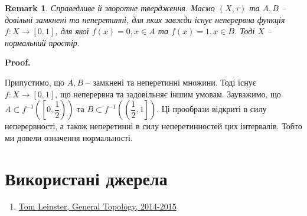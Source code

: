 \documentclass[a4paper, 10pt]{article}
\makeatletter
\theoremstyle{theoremdd}
\newtheorem{definition}[theorem]{Definition}
\newtheorem{remark}[theorem]{Remark}
\renewenvironment{proof}[1][Proof.\\]{\par
\pushQED{\hfill \qed}%
\normalfont \topsep6\p@\@plus6\p@\relax
\trivlist
\item\relax
{\bfseries
#1\@addpunct{.}}\hspace\labelsep\ignorespaces
}{%
\popQED\endtrivlist\@endpefalse
}
\makeatother
\begin{document}
\begin{remark}
Справедливе й зворотне твердження. Маємо $(X,\tau)$ та $A,B$ -- довільні замкнені та неперетинні, для яких завжди існує неперервна функція $f \colon X \to [0,1]$, для якої $f(x) = 0, x \in A$ та $f(x) = 1, x \in B$. Тоді $X$ -- нормальний простір.
\end{remark}

\begin{proof}
Припустимо, що $A,B$ -- замкнені та неперетинні множини. Тоді існує $f \colon X \to [0,1]$, що неперервна та задовільняє іншим умовам. Зауважимо, що $A \subset f^{-1} \left(\left[0, \dfrac{1}{2}\right)\right)$ та $B \subset f^{-1}\left(\left(\dfrac{1}{2},1\right]\right)$. Ці прообрази відкриті в силу неперервності, а також неперетинні в силу неперетинностей цих інтервалів. Тобто ми довели означення нормальності.
\end{proof}
\newpage

\section*{Використані джерела}
\begin{enumerate}
\item \href{https://www.maths.ed.ac.uk/~tl/topology/topology_notes.pdf}{Tom Leinster, General Topology, 2014-2015}
\end{enumerate}

\iffalse
\begin{definition}
Задано $(X,\tau)$ -- топологічний простір.\\
Ми будемо це називати \textbf{гаусдорфовим простором}, якщо
\begin{align*}
\forall x,y \in X: x \neq y: \exists U_x,U_y \text{ -- відкриті околи точок } x,y: U_x \cap U_y = \emptyset
\end{align*}
\end{definition}
\fi
\end{document}
